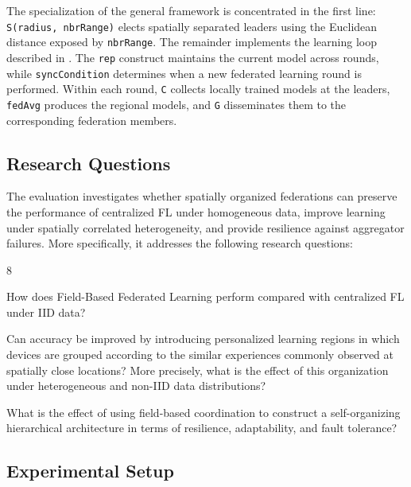 The specialization of the general framework is concentrated in the first line:
 \lstinline[language=scafi]|S(radius, nbrRange)| elects spatially separated
 leaders using the Euclidean distance exposed by \lstinline[language=scafi]|nbrRange|.
%
The remainder implements the learning loop described in .
%
The \lstinline[language=scafi]|rep| construct maintains the current model across rounds, 
 while \lstinline[language=scafi]|syncCondition| determines when a new federated learning round is performed.
%
Within each round, \texttt{C} collects locally trained models at the leaders,
 \lstinline[language=scafi]|fedAvg| produces the regional models, 
 and \texttt{G} disseminates them to the corresponding federation members.


\subsection{Research Questions}
\label{sec:fbfl-research-questions}

The evaluation investigates whether spatially organized federations can preserve
 the performance of centralized \gls{FL} under homogeneous data, 
 improve learning under spatially correlated heterogeneity, 
 and provide resilience against aggregator failures.
%
More specifically, 
 it addresses the following research questions:

\begin{chapRQ}{8}
  \item
  How does Field-Based Federated Learning perform compared with centralized
  \gls{FL} under \gls{IID} data?
  \label{rq:fbfl-iid}

  \item
  Can accuracy be improved by introducing personalized learning regions in
  which devices are grouped according to the similar experiences commonly
  observed at spatially close locations?
  More precisely, what is the effect of this organization under heterogeneous
  and non-\gls{IID} data distributions?
  \label{rq:fbfl-non-iid}

  \item
  What is the effect of using field-based coordination to construct a
  self-organizing hierarchical architecture in terms of resilience,
  adaptability, and fault tolerance?
  \label{rq:fbfl-resilience}
\end{chapRQ}


\subsection{Experimental Setup}
\label{sec:fbfl-experimental-setup}

